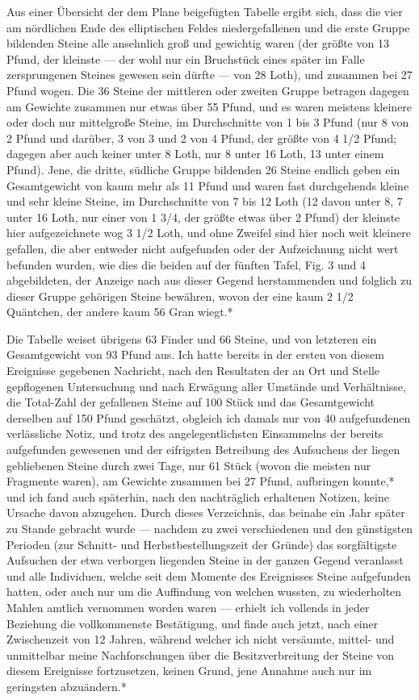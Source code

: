 \documentclass[a4paper, 11pt, oneside, german]{article}
\begin{document}
Aus einer Übersicht der dem Plane beigefügten Tabelle ergibt sich, dass die vier am nördlichen Ende des elliptischen Feldes niedergefallenen und die erste Gruppe bildenden Steine alle ansehnlich groß und gewichtig waren (der größte von 13 Pfund, der kleinste --- der wohl nur ein Bruchstück eines später im Falle zersprungenen Steines gewesen sein dürfte --- von 28 Loth), und zusammen bei 27 Pfund wogen. Die 36 Steine der mittleren oder zweiten Gruppe betragen dagegen am Gewichte zusammen nur etwas über 55 Pfund, und es waren meistens kleinere oder doch nur mittelgroße Steine, im Durchschnitte von 1 bis 3 Pfund (nur 8 von 2 Pfund und darüber, 3 von 3 und 2 von 4 Pfund, der größte von 4 1/2 Pfund; dagegen aber auch keiner unter 8 Loth, nur 8 unter 16 Loth, 13 unter einem Pfund). Jene, die dritte, südliche Gruppe bildenden 26 Steine endlich geben ein Gesamtgewicht von kaum mehr als 11 Pfund und waren fast durchgehends kleine und sehr kleine Steine, im Durchschnitte von 7 bis 12 Loth (12 davon unter 8, 7 unter 16 Loth, nur einer von 1 3/4, der größte etwas über 2 Pfund) der kleinste hier aufgezeichnete wog 3 1/2 Loth, und ohne Zweifel sind hier noch weit kleinere gefallen, die aber entweder nicht aufgefunden oder der Aufzeichnung nicht wert befunden wurden, wie dies die beiden auf der fünften Tafel, Fig. 3 und 4 abgebildeten, der Anzeige nach aus dieser Gegend herstammenden und folglich zu dieser Gruppe gehörigen Steine bewähren, wovon der eine kaum 2 1/2 Quäntchen, der andere kaum 56 Gran wiegt.*

Die Tabelle weiset übrigens 63 Finder und 66 Steine, und von letzteren ein Gesamtgewicht von 93 Pfund aus. Ich hatte bereits in der ersten von diesem Ereignisse gegebenen Nachricht, nach den Resultaten der an Ort und Stelle gepflogenen Untersuchung und nach Erwägung aller Umstände und Verhältnisse, die Total-Zahl der gefallenen Steine auf 100 Stück und das Gesamtgewicht derselben auf 150 Pfund geschätzt, obgleich ich damals nur von 40 aufgefundenen verlässliche Notiz, und trotz des angelegentlichsten Einsammelns der bereits aufgefunden gewesenen und der eifrigsten Betreibung des Aufsuchens der liegen gebliebenen Steine durch zwei Tage, nur 61 Stück (wovon die meisten nur Fragmente waren), am Gewichte zusammen bei 27 Pfund, aufbringen konnte,* und ich fand auch späterhin, nach den nachträglich erhaltenen Notizen, keine Ursache davon abzugehen. Durch dieses Verzeichnis, das beinahe ein Jahr später zu Stande gebracht wurde --- nachdem zu zwei verschiedenen und den günstigsten Perioden (zur Schnitt- und Herbstbestellungszeit der Gründe) das sorgfältigste Aufsuchen der etwa verborgen liegenden Steine in der ganzen Gegend veranlasst und alle Individuen, welche seit dem Momente des Ereignisses Steine aufgefunden hatten, oder auch nur um die Auffindung von welchen wussten, zu wiederholten Mahlen amtlich vernommen worden waren --- erhielt ich vollends in jeder Beziehung die vollkommenste Bestätigung, und finde auch jetzt, nach einer Zwischenzeit von 12 Jahren, während welcher ich nicht versäumte, mittel- und unmittelbar meine Nachforschungen über die Besitzverbreitung der Steine von diesem Ereignisse fortzusetzen, keinen Grund, jene Annahme auch nur im geringsten abzuändern.*
\end{document}
